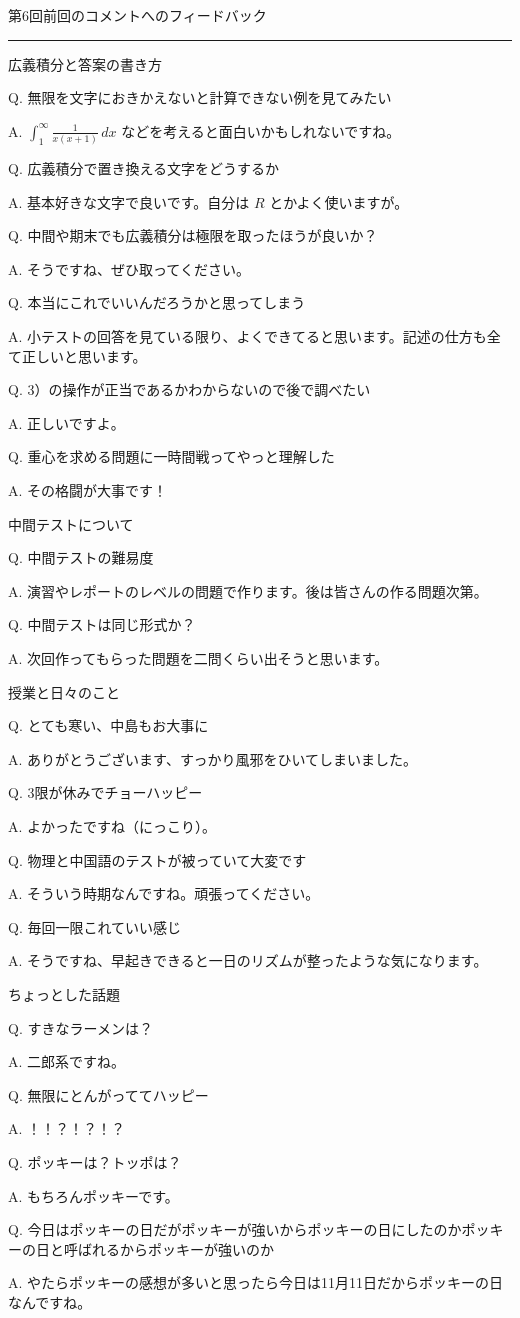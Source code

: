 \documentclass[a4paper,10pt,pdflatex,ja=standard,jafont=ipaex-type1,
  magstyle=real,scale=1]{bxjsarticle}
\newcommand{\coursename}{解析学 II}
\newcommand{\handoutnumber}{6}
\newcommand{\handouttitle}[1]{%
  \begin{center}
    {\Large\color{ink}#1}\par\vspace{3mm}
    {\color{accent}\rule{0.88\linewidth}{0.7pt}}
  \end{center}\vspace{-2mm}}
\newcommand{\handout}[2]{%
  \renewcommand{\handoutnumber}{#1}%
  \handouttitle{第#1回\quad #2}}
\newcommand{\topic}[1]{\par\vspace{5pt}%
  {\large\sffamily\mdseries\color{accent}#1}\par\vspace{2pt}}
\newcommand{\feedback}[2]{%
  \par\addvspace{3pt}\noindent\begin{minipage}{\linewidth}%
  {\color{ink}Q. #1}\par\vspace{1pt}%
  {\color{accent}A. }#2%
  \end{minipage}\par}
\begin{document}
\fontsize{10pt}{13.5pt}\selectfont
\setlength{\abovedisplayskip}{4pt}
\setlength{\belowdisplayskip}{4pt}
\fancyhead[L]{\small\color{ink}\coursename{}・フィードバック}
\handout{6}{前回のコメントへのフィードバック}
\topic{広義積分と答案の書き方}
\feedback{無限を文字におきかえないと計算できない例を見てみたい}{%
$\displaystyle\int_1^\infty\frac{1}{x(x+1)}\,dx$ などを考えると面白いかもしれないですね。}

\feedback{広義積分で置き換える文字をどうするか}{%
基本好きな文字で良いです。自分は $R$ とかよく使いますが。}

\feedback{中間や期末でも広義積分は極限を取ったほうが良いか？}{%
そうですね、ぜひ取ってください。}

\feedback{本当にこれでいいんだろうかと思ってしまう}{%
小テストの回答を見ている限り、よくできてると思います。記述の仕方も全て正しいと思います。}

\feedback{3）の操作が正当であるかわからないので後で調べたい}{%
正しいですよ。}

\feedback{重心を求める問題に一時間戦ってやっと理解した}{%
その格闘が大事です！}

\topic{中間テストについて}
\feedback{中間テストの難易度}{%
演習やレポートのレベルの問題で作ります。後は皆さんの作る問題次第。}

\feedback{中間テストは同じ形式か？}{%
次回作ってもらった問題を二問くらい出そうと思います。}

\topic{授業と日々のこと}
\feedback{とても寒い、中島もお大事に}{%
ありがとうございます、すっかり風邪をひいてしまいました。}

\feedback{3限が休みでチョーハッピー}{%
よかったですね（にっこり）。}

\feedback{物理と中国語のテストが被っていて大変です}{%
そういう時期なんですね。頑張ってください。}

\feedback{毎回一限これていい感じ}{%
そうですね、早起きできると一日のリズムが整ったような気になります。}

\topic{ちょっとした話題}
\feedback{すきなラーメンは？}{%
二郎系ですね。}

\feedback{無限にとんがっててハッピー}{%
！！？！？！？}

\feedback{ポッキーは？トッポは？}{%
もちろんポッキーです。}

\feedback{今日はポッキーの日だがポッキーが強いからポッキーの日にしたのかポッキーの日と呼ばれるからポッキーが強いのか}{%
やたらポッキーの感想が多いと思ったら今日は11月11日だからポッキーの日なんですね。}
\clearpage
\end{document}
